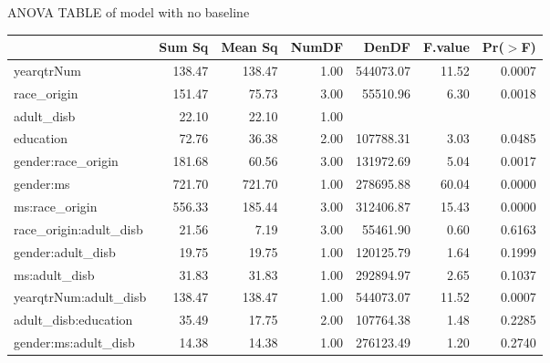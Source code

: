 \documentclass[11pt]{extarticle} %
\begin{document}
ANOVA TABLE of model with no baseline\\
\begin{table}[ht]
\footnotesize
\centering
\begin{tabular}{lrrrrrr}
  \hline
 & Sum Sq & Mean Sq & NumDF & DenDF & F.value & Pr($>$F) \\ 
  \hline
  yearqtrNum & 138.47 & 138.47 & 1.00 & 544073.07 & 11.52 & 0.0007 \\ 
  race\_origin & 151.47 & 75.73 & 3.00 & 55510.96 & 6.30 & 0.0018 \\ 
  adult\_disb & 22.10 & 22.10 & 1.00 &  &  &  \\ 
  education & 72.76 & 36.38 & 2.00 & 107788.31 & 3.03 & 0.0485 \\ 
  gender:race\_origin & 181.68 & 60.56 & 3.00 & 131972.69 & 5.04 & 0.0017 \\ 
  gender:ms & 721.70 & 721.70 & 1.00 & 278695.88 & 60.04 & 0.0000 \\ 
  ms:race\_origin & 556.33 & 185.44 & 3.00 & 312406.87 & 15.43 & 0.0000 \\ 
  race\_origin:adult\_disb & 21.56 & 7.19 & 3.00 & 55461.90 & 0.60 & 0.6163 \\ 
  gender:adult\_disb & 19.75 & 19.75 & 1.00 & 120125.79 & 1.64 & 0.1999 \\ 
  ms:adult\_disb & 31.83 & 31.83 & 1.00 & 292894.97 & 2.65 & 0.1037 \\ 
  yearqtrNum:adult\_disb & 138.47 & 138.47 & 1.00 & 544073.07 & 11.52 & 0.0007 \\ 
  adult\_disb:education & 35.49 & 17.75 & 2.00 & 107764.38 & 1.48 & 0.2285 \\ 
  gender:ms:adult\_disb & 14.38 & 14.38 & 1.00 & 276123.49 & 1.20 & 0.2740 \\ 
   \hline
\end{tabular}
\end{table}
\end{document}
